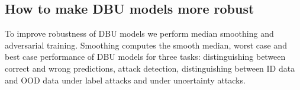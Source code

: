 \clearpage
\subsection{How to make DBU models more robust}

To improve robustness of DBU models we perform median smoothing and adversarial training. Smoothing computes the smooth median, worst case and best case performance of DBU models for three tasks:  distinguishing between correct and wrong predictions, attack detection, distinguishing between ID data and OOD data under label attacks and under uncertainty attacks. 


\begin{table}[ht!]
	\centering
	\caption{Distinguishing between correctly and wrongly labeled inputs based on differential entropy under PGD label attacks. Smoothed DBU models on CIFAR10. Column format: guaranteed lowest performance $\cdot$ empirical performance $\cdot$ guaranteed highest performance (blue: normally/adversarially trained smooth classifier is more robust than the base model).}
	\label{tab:cifar10_smooth_confidence}
\end{table}


